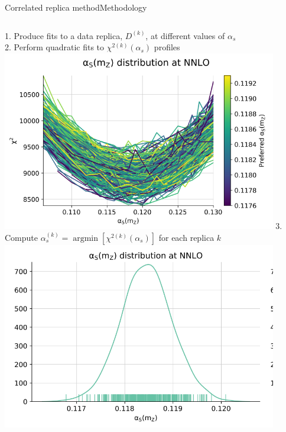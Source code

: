 \documentclass[aspectratio=169, 8pt,t]{beamer}
\begin{document}
\begin{frame}{Correlated replica method}{Methodology}
  \begin{columns}
    1. Produce fits to a data replica, $D^{(k)}$, at different values of $\alpha_s$\\\vspace*{1em}
    2. Perform quadratic fits to $\chi^{2(k)}(\alpha_s)$ profiles \\
    \includegraphics[width=0.9\textwidth]{figures/parabolaplotnnpdf31.png}
    3. Compute $\alpha_s^{(k)}=\operatorname{argmin}\left[\chi^{2(k)}\left(\alpha_s\right)\right]$  for each replica $k$ \\
    \includegraphics[width=0.9\textwidth]{figures/alphasnnpdf31result.png}
  \end{columns}
\end{frame}
\end{document}
